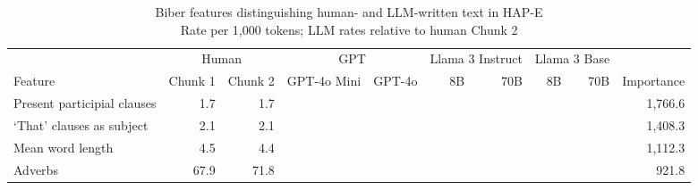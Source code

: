 \begin{table}[!t]
\caption*{
{\large Biber features distinguishing human- and LLM-written text in HAP-E} \\ 
{\small Rate per 1,000 tokens; LLM rates relative to human Chunk 2}
} 
\fontsize{12.0pt}{14.4pt}\selectfont
\begin{tabular*}{\linewidth}{@{\extracolsep{\fill}}lrrrrrrrrr}
\toprule
 & \multicolumn{2}{c}{Human} & \multicolumn{2}{c}{GPT} & \multicolumn{2}{c}{Llama 3 Instruct} & \multicolumn{2}{c}{Llama 3 Base} &  \\ 
\cmidrule(lr){2-3} \cmidrule(lr){4-5} \cmidrule(lr){6-7} \cmidrule(lr){8-9}
Feature & Chunk 1 & Chunk 2 & GPT-4o Mini & GPT-4o & 8B & 70B & 8B & 70B & Importance \\ 
\midrule\addlinespace[2.5pt]
Present participial clauses & 1.7 & 1.7 & {\cellcolor[HTML]{2166AC}{\textcolor[HTML]{FFFFFF}{481\%}}} & {\cellcolor[HTML]{2166AC}{\textcolor[HTML]{FFFFFF}{527\%}}} & {\cellcolor[HTML]{4393C3}{\textcolor[HTML]{FFFFFF}{224\%}}} & {\cellcolor[HTML]{4393C3}{\textcolor[HTML]{FFFFFF}{261\%}}} & {\cellcolor[HTML]{F7F7F7}{\textcolor[HTML]{000000}{94\%}}} & {\cellcolor[HTML]{F7F7F7}{\textcolor[HTML]{000000}{102\%}}} & 1,766.6 \\ 
‘That’ clauses as subject & 2.1 & 2.1 & {\cellcolor[HTML]{4393C3}{\textcolor[HTML]{FFFFFF}{331\%}}} & {\cellcolor[HTML]{4393C3}{\textcolor[HTML]{FFFFFF}{263\%}}} & {\cellcolor[HTML]{92C5DE}{\textcolor[HTML]{000000}{180\%}}} & {\cellcolor[HTML]{92C5DE}{\textcolor[HTML]{000000}{173\%}}} & {\cellcolor[HTML]{F4A582}{\textcolor[HTML]{000000}{64\%}}} & {\cellcolor[HTML]{F4A582}{\textcolor[HTML]{000000}{68\%}}} & 1,408.3 \\ 
Mean word length & 4.5 & 4.4 & {\cellcolor[HTML]{D1E5F0}{\textcolor[HTML]{000000}{114\%}}} & {\cellcolor[HTML]{D1E5F0}{\textcolor[HTML]{000000}{116\%}}} & {\cellcolor[HTML]{F7F7F7}{\textcolor[HTML]{000000}{101\%}}} & {\cellcolor[HTML]{F7F7F7}{\textcolor[HTML]{000000}{103\%}}} & {\cellcolor[HTML]{F7F7F7}{\textcolor[HTML]{000000}{99\%}}} & {\cellcolor[HTML]{F7F7F7}{\textcolor[HTML]{000000}{100\%}}} & 1,112.3 \\ 
Adverbs & 67.9 & 71.8 & {\cellcolor[HTML]{FDDBC7}{\textcolor[HTML]{000000}{86\%}}} & {\cellcolor[HTML]{FDDBC7}{\textcolor[HTML]{000000}{82\%}}} & {\cellcolor[HTML]{F4A582}{\textcolor[HTML]{000000}{73\%}}} & {\cellcolor[HTML]{F4A582}{\textcolor[HTML]{000000}{75\%}}} & {\cellcolor[HTML]{F7F7F7}{\textcolor[HTML]{000000}{102\%}}} & {\cellcolor[HTML]{F7F7F7}{\textcolor[HTML]{000000}{102\%}}} & 921.8 \\ 

\end{tabular*}
\end{table}

